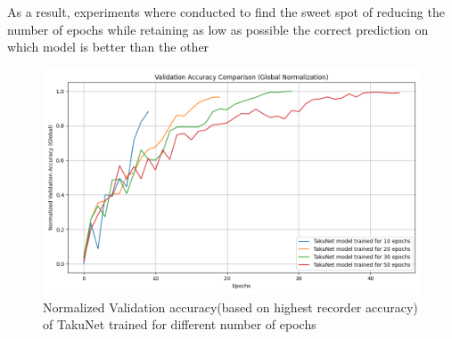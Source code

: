 As a result, experiments where conducted to find the sweet spot of reducing the number of epochs while retaining  as low as possible the correct prediction on which model is better than the other

\begin{figure}[ht]
    \centering
    \includegraphics[width=0.85\linewidth]{Pictures/val_accuracy_comparison_global.png}
    \caption{Normalized Validation accuracy(based on highest recorder accuracy) of TakuNet trained for different number of epochs }
    \label{fig:val_accuracy_diff_epochs}
\end{figure}